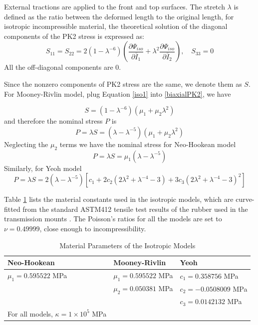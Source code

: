 External tractions are applied to the front and top surfaces. The stretch $\lambda$ is defined as the ratio between the deformed length to the original length, for isotropic incompressible material, the theoretical solution of the diagonal components of the PK2 stress is expressed as:
\begin{equation} \label{biaxialPK2}
S_{11} = S_{22} = 2(1 - {\lambda}^{-6})(\frac{\partial\Psi_{iso}}{\partial\bar{I}_1} + {\lambda}^2\frac{\partial\Psi_{iso}}{\partial\bar{I}_2}), \quad S_{33} = 0
\end{equation}
All the off-diagonal components are $0$.

Since the nonzero components of PK2 stress are the same, we denote them as $S$. For Mooney-Rivlin model, plug Equation \ref{iso1} into \ref{biaxialPK2}, we have

\begin{equation}
S = (1 - {\lambda}^{-6})(\mu_1 + \mu_2{\lambda}^2)
\end{equation}
and therefore the nominal stress $P$ is
\begin{equation}
P = \lambda S =  (\lambda - {\lambda}^{-5})(\mu_1 + \mu_2{\lambda}^2)
\end{equation}
Neglecting the $\mu_2$ terms we have the nominal stress for Neo-Hookean model
\begin{equation}
P = \lambda S =  \mu_1(\lambda - {\lambda}^{-5})
\end{equation}
Similarly, for Yeoh model
\begin{equation}
P = \lambda S = 2(\lambda - {\lambda}^{-5})[c_1 + 2c_2(2{\lambda}^2 + {\lambda}^{-4} - 3) + 3c_3(2{\lambda}^2 + {\lambda}^{-4} - 3)^2]
\end{equation}



Table \ref{parameters} lists the material constants used in the isotropic models, which are curve-fitted from the standard ASTM412 tensile test results of the rubber used in the transmission mounts \cite{Sharma}. The Poisson's ratios for all the models are set to $\nu = 0.49999$, close enough to incompressibility.

\begin{table}[H]
\centering
\caption{Material Parameters of the Isotropic Models}
\begin{tabular} { l  l  l }
	\hline
	Neo-Hookean & Mooney-Rivlin & Yeoh \\
	\hline
	$\mu_1 = 0.595522$ MPa & $\mu_1 = 0.595522$ MPa & $c_1 = 0.358756$ MPa \\
	& $\mu_2 = 0.050381$ MPa & $c_2 = - 0.0508009$ MPa \\
	& & $c_3 = 0.0142132$ MPa \\
	\hline
	For all models, $\kappa = 1 \times 10^5 $ MPa \\
	\hline
\end{tabular}
\label{parameters}
\end{table}

